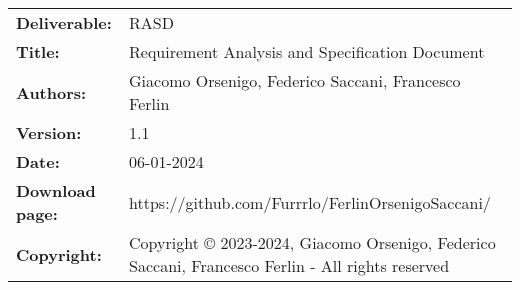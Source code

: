 \documentclass{config/PoliMi3i_thesis}
\begin{document}


\pagestyle{empty} %
\frontmatter %


\renewcommand{\headrulewidth}{0pt} %
\begin{table}[h!]
    \begin{tabu} to \textwidth { X[0.3,r,p] X[0.7,l,p] }
        \hline

        \textbf{Deliverable:}   & RASD                                                                                                \\
        \textbf{Title:}         & Requirement Analysis and Specification Document                                                     \\
        \textbf{Authors:}       & Giacomo Orsenigo, Federico Saccani, Francesco Ferlin                                                \\
        \textbf{Version:}       & 1.1                                                                                                 \\
        \textbf{Date:}          & 06{-}01{-}2024                                                                                      \\
        \textbf{Download page:} & https://github.com/Furrrlo/FerlinOrsenigoSaccani/                                                   \\
        \textbf{Copyright:}     & Copyright © 2023-2024, Giacomo Orsenigo, Federico Saccani, Francesco Ferlin {-} All rights reserved \\
        \hline
    \end{tabu}
\end{table}
\end{document}
